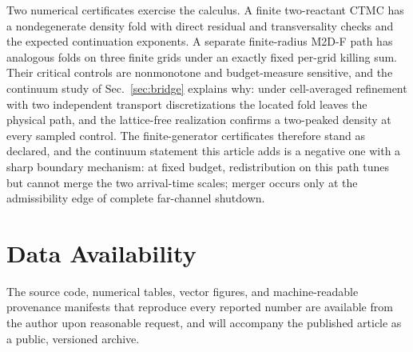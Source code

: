 \documentclass[aps,pre,reprint,amsmath,amssymb,longbibliography,floatfix]{revtex4-2}
\begin{document}
Two numerical certificates exercise the calculus. A finite two-reactant CTMC
has a nondegenerate density fold with direct residual and transversality
checks and the expected continuation exponents. A separate finite-radius M2D-F
path has analogous folds on three finite grids under an exactly fixed
per-grid killing sum. Their critical controls are nonmonotone and
budget-measure sensitive, and the continuum study of Sec.~\ref{sec:bridge}
explains why: under cell-averaged refinement with two independent transport
discretizations the located fold leaves the physical path, and the
lattice-free realization confirms a two-peaked density at every sampled
control.
The finite-generator certificates therefore stand as declared, and the
continuum statement this article adds is a negative one with a sharp
boundary mechanism: at fixed budget, redistribution on this path tunes but
cannot merge the two arrival-time scales; merger occurs only at the
admissibility edge of complete far-channel shutdown.

\section*{Data Availability}

The source code, numerical tables, vector figures, and machine-readable
provenance manifests that reproduce every reported number are available from
the author upon reasonable request, and will accompany the published article
as a public, versioned archive.


\end{document}
